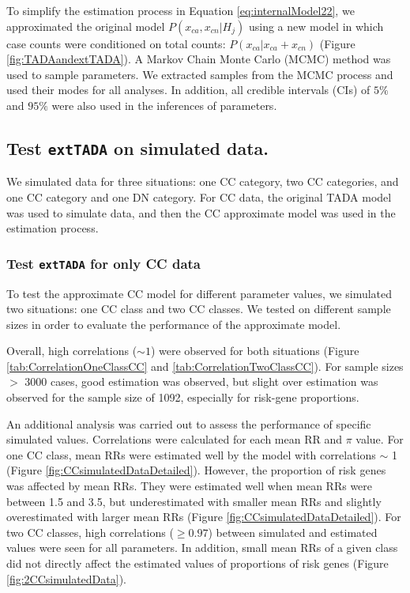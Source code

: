 \documentclass[]{article}
\begin{document}
To simplify the estimation process in Equation
\ref{eq:internalModel22}, we approximated the original model $P(x_{ca}, x_{cn}|H_j)$
using a new model in which case counts were conditioned on total counts:
$P(x_{ca}|x_{ca} + x_{cn})$ (Figure
\ref{fig:TADAandextTADA}). A Markov Chain
Monte Carlo (MCMC) method was used to sample parameters. We extracted
samples from the MCMC process and used their modes for all analyses.
In addition, all credible intervals (CIs) of $5\%$ and $95\%$ were
also used in the inferences of parameters.

\subsection{Test \texttt{extTADA} on simulated data. }

We simulated data for three
situations: one CC category, two CC categories, and one CC category and
one DN category. For CC data, the original TADA model was used to
simulate data, and then the CC approximate
model was used in the estimation process.


\subsubsection{Test \texttt{extTADA} for only CC data}

To test the approximate CC model for
different parameter values, we simulated two situations: one CC class
and two CC classes. We tested on different sample sizes in order to
evaluate the performance of the approximate model.

Overall, high correlations ($\sim 1$) were observed for both situations (Figure
\ref{tab:CorrelationOneClassCC} and
\ref{tab:CorrelationTwoClassCC}). For sample sizes $>$ 3000 cases,
good estimation was observed, but slight over estimation was
observed for the sample size of 1092, especially for risk-gene
proportions.

An additional analysis was carried out to assess the
performance of specific simulated values. Correlations were
calculated for each mean RR and $\pi$ value.
For one CC class, mean RRs were estimated well by
the model with correlations $\sim$ 1 (Figure \ref{fig:CCsimulatedDataDetailed}). However, the proportion of risk
genes was affected by mean RRs. They were estimated well when mean
RRs were between 1.5 and 3.5, but underestimated with smaller mean RRs and
slightly overestimated with larger mean RRs (Figure
\ref{fig:CCsimulatedDataDetailed}). For two CC classes, high
correlations ($\ge 0.97$) between simulated and estimated values were
seen for all parameters. In
addition, small mean RRs of a given class did not directly affect the
estimated values of proportions of risk genes (Figure \ref{fig:2CCsimulatedData}).
\end{document}
